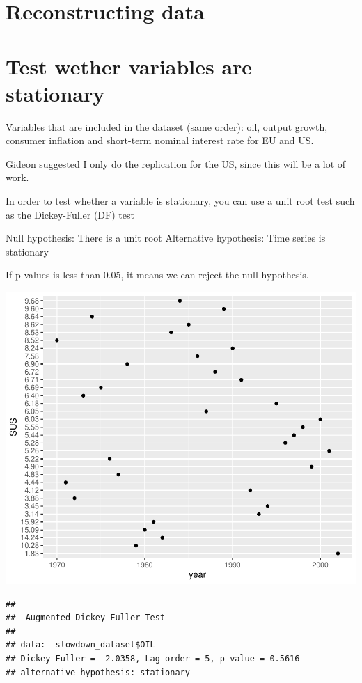\documentclass[11pt,preprint, authoryear]{elsarticle}
\numberwithin{equation}{section}
\numberwithin{figure}{section}
\numberwithin{table}{section}
\begin{document}
\hypertarget{reconstructing-data}{%
\section{Reconstructing data}\label{reconstructing-data}}

\hypertarget{test-wether-variables-are-stationary}{%
\section{\texorpdfstring{Test wether variables are stationary
\label{stationary}}{Test wether variables are stationary }}\label{test-wether-variables-are-stationary}}

Variables that are included in the dataset (same order): oil, output
growth, consumer inflation and short-term nominal interest rate for EU
and US.

Gideon suggested I only do the replication for the US, since this will
be a lot of work.

In order to test whether a variable is stationary, you can use a unit
root test such as the Dickey-Fuller (DF) test

Null hypothesis: There is a unit root Alternative hypothesis: Time
series is stationary

If p-values is less than 0.05, it means we can reject the null
hypothesis.

\includegraphics{replication_files/figure-latex/unnamed-chunk-2-1.pdf}

\begin{verbatim}
## 
##  Augmented Dickey-Fuller Test
## 
## data:  slowdown_dataset$OIL
## Dickey-Fuller = -2.0358, Lag order = 5, p-value = 0.5616
## alternative hypothesis: stationary
\end{verbatim}
\end{document}
